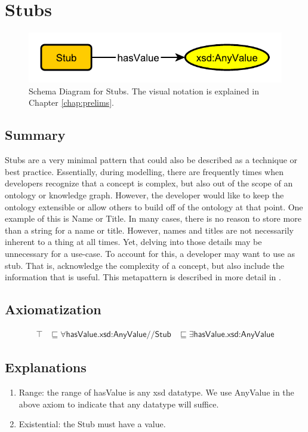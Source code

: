 \section{Stubs}
\label{sec:Stubs}
\begin{figure}[h!]
\begin{center}
\includegraphics[width=.4\textwidth]{figures/stubs}
\end{center}
\caption{Schema Diagram for Stubs. The visual notation is explained in Chapter \ref{chap:prelims}.}
\label{fig:Stubs}
\end{figure}
\subsection{Summary}
\label{sum:Stubs}
Stubs are a very minimal pattern that could also be described as a technique or best practice. Essentially, during modelling, there are frequently times when developers recognize that a concept is complex, but also out of the scope of an ontology or knowledge graph. However, the developer would like to keep the ontology extensible or allow others to build off of the ontology at that point. One example of this is Name or Title. In many cases, there is no reason to store more than a string for a name or title. However, names and titles are not necessarily inherent to a thing at all times. Yet, delving into those details may be unnecessary for a use-case. To account for this, a developer may want to use as stub. That is, acknowledge the complexity of a concept, but also include the information that is useful. This metapattern is described in more detail in \cite{stub}. 

\subsection{Axiomatization}
\label{axs:Stubs}
\begin{align}
\top &\sqsubseteq \forall \textsf{hasValue.xsd:AnyValue} //
\textsf{Stub} &\sqsubseteq \exists \textsf{hasValue.xsd:AnyValue}
\end{align}

\subsection{Explanations}
\label{exp:Stubs}
\begin{enumerate}
\item Range: the range of \textsf{hasValue} is any xsd datatype. We use AnyValue in the above axiom to indicate that any datatype will suffice.
\item Existential: the \textsf{Stub} must have a value.
\end{enumerate}

